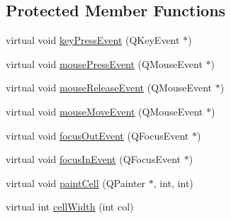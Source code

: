 \subsection*{Protected Member Functions}
\begin{DoxyCompactItemize}
\item 
virtual void \hyperlink{classNetHackQtMenuWindow_a9ae20d6563c049877d9ca5403327fa6e}{key\+Press\+Event} (Q\+Key\+Event $\ast$)
\item 
virtual void \hyperlink{classNetHackQtMenuWindow_a1d64ba5624cbc0811b8b1de1b046d8d0}{mouse\+Press\+Event} (Q\+Mouse\+Event $\ast$)
\item 
virtual void \hyperlink{classNetHackQtMenuWindow_a13f9b73b894df7ffee638757fb2d7600}{mouse\+Release\+Event} (Q\+Mouse\+Event $\ast$)
\item 
virtual void \hyperlink{classNetHackQtMenuWindow_a2c7d2cd7a90d46c7e8bb36be45175d80}{mouse\+Move\+Event} (Q\+Mouse\+Event $\ast$)
\item 
virtual void \hyperlink{classNetHackQtMenuWindow_a88708bfb27eaee1482e2b3e30e211fda}{focus\+Out\+Event} (Q\+Focus\+Event $\ast$)
\item 
virtual void \hyperlink{classNetHackQtMenuWindow_a04722af903984090f49d5ced6faca9cc}{focus\+In\+Event} (Q\+Focus\+Event $\ast$)
\item 
virtual void \hyperlink{classNetHackQtMenuWindow_a7a6c20ff63e016a9fca2b1d9d3f5fa6f}{paint\+Cell} (Q\+Painter $\ast$, int, int)
\item 
virtual int \hyperlink{classNetHackQtMenuWindow_af45926adf9003538bac500464ff4b2a3}{cell\+Width} (int col)
\end{DoxyCompactItemize}
